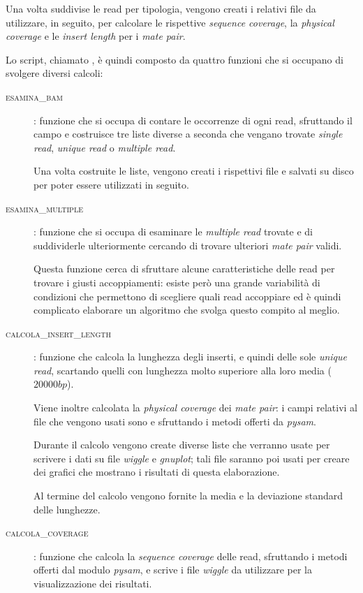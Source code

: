 Una volta suddivise le read per tipologia, vengono creati i relativi file  da utilizzare, in seguito, per calcolare le rispettive \emph{sequence coverage}, la \emph{physical coverage} e le \emph{insert length} per i \emph{mate pair}.

Lo script, chiamato , è quindi composto da quattro funzioni che si occupano di svolgere diversi calcoli:

\begin{description}
\item[\textsc{esamina\_bam}]: funzione che si occupa di contare le occorrenze di ogni read, sfruttando il campo  e costruisce tre liste diverse a seconda che vengano trovate \emph{single read}, \emph{unique read} o \emph{multiple read}.

Una volta costruite le liste, vengono creati i rispettivi file  e salvati su disco per poter essere utilizzati in seguito.

\item[\textsc{esamina\_multiple}]: funzione che si occupa di esaminare le \emph{multiple read} trovate e di suddividerle ulteriormente cercando di trovare ulteriori \emph{mate pair} validi.

Questa funzione cerca di sfruttare alcune caratteristiche delle read per trovare i giusti accoppiamenti: esiste però una grande variabilità di condizioni che permettono di scegliere quali read accoppiare ed è quindi complicato elaborare un algoritmo che svolga questo compito al meglio.

\item[\textsc{calcola\_insert\_length}]: funzione che calcola la lunghezza degli inserti, e quindi delle sole \emph{unique read}, scartando quelli con lunghezza molto superiore alla loro media ($20000bp$).

Viene inoltre calcolata la \emph{physical coverage} dei \emph{mate pair}: i campi relativi al file  che vengono usati sono  e  sfruttando i metodi offerti da \emph{pysam}.

Durante il calcolo vengono create diverse liste che verranno usate per scrivere i dati su file \emph{wiggle} e \emph{gnuplot}; tali file saranno poi usati per creare dei grafici che mostrano i risultati di questa elaborazione.

Al termine del calcolo vengono fornite la media e la deviazione standard delle lunghezze.

\item[\textsc{calcola\_coverage}]: funzione che calcola la \emph{sequence coverage} delle read, sfruttando i metodi offerti dal modulo \emph{pysam}, e scrive i file \emph{wiggle} da utilizzare per la visualizzazione dei risultati.
\end{description}

